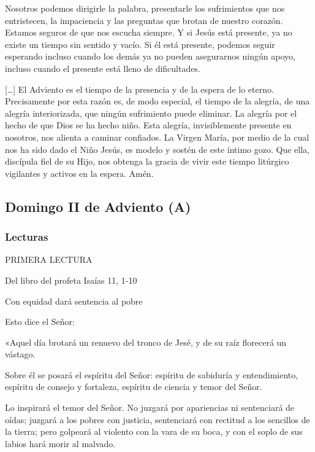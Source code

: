 \documentclass[]{article}
\begin{document}
Nosotros podemos dirigirle la palabra, presentarle los sufrimientos que
nos entristecen, la impaciencia y las preguntas que brotan de nuestro
corazón. Estamos seguros de que nos escucha siempre. Y si Jesús está
presente, ya no existe un tiempo sin sentido y vacío. Si él está
presente, podemos seguir esperando incluso cuando los demás ya no pueden
asegurarnos ningún apoyo, incluso cuando el presente está lleno de
dificultades.

{[}\ldots{}{]} El Adviento es el tiempo de la presencia y de la espera
de lo eterno. Precisamente por esta razón es, de modo especial, el
tiempo de la alegría, de una alegría interiorizada, que ningún
sufrimiento puede eliminar. La alegría por el hecho de que Dios se ha
hecho niño. Esta alegría, invisiblemente presente en nosotros, nos
alienta a caminar confiados. La Virgen María, por medio de la cual nos
ha sido dado el Niño Jesús, es modelo y sostén de este íntimo gozo. Que
ella, discípula fiel de su Hijo, nos obtenga la gracia de vivir este
tiempo litúrgico vigilantes y activos en la espera. Amén.



\subsection{}\label{section}

\subsection{Domingo II de Adviento (A)}\label{domingo-ii-de-adviento-a}

\subsubsection{Lecturas}\label{lecturas-1}

PRIMERA LECTURA

Del libro del profeta Isaías 11, 1-10

Con equidad dará sentencia al pobre

Esto dice el Señor:

«Aquel día brotará un renuevo del tronco de Jesé, y de su raíz florecerá
un vástago.

Sobre él se posará el espíritu del Señor: espíritu de sabiduría y
entendimiento, espíritu de consejo y fortaleza, espíritu de ciencia y
temor del Señor.

Lo inspirará el temor del Señor. No juzgará por apariencias ni
sentenciará de oídas; juzgará a los pobres con justicia, sentenciará con
rectitud a los sencillos de la tierra; pero golpeará al violento con la
vara de su boca, y con el soplo de sus labios hará morir al malvado.
\end{document}
